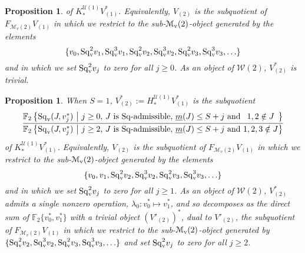 \documentclass[11pt]{amsart}
\theoremstyle{plain}
\newtheorem{prop}[thm]{Proposition}
\theoremstyle{definition}
\newcommand{\calW}{\mathcal{W}}
\newcommand{\calU}{\mathcal{U}}
\newcommand{\calM}{\mathcal{M}}
\theoremstyle{plain}
\newcommand{\minDimSq}{\underline{m}}
\newcommand{\Sq}{\mathrm{Sq}}
\newcommand{\Sqv}{\mathrm{Sq}_\textup{v}}
\newcommand{\F}{\mathbb{F}}
\begin{document}
\begin{Calculations of HWn for n nonzero}
\begin{prop}
 of $K_*^{\calU(1)}V_{(1)}^*$. Equivalently, $V_{(2)}$ is the subquotient of $F_{\calM_v(2)}V_{(1)}$ in which we restrict to the sub-$\calM_\textup{v}(2)$-object generated by the elements%
\[\{v_0,\Sqv^2v_{1},\Sqv^3v_{1},\Sqv^2v_{2},\Sqv^3v_{2},\Sqv^2v_{3},\Sqv^3v_{3},\ldots\}\]
and in which we set $\Sqv^2 v_{j}$ to zero for all $j\geq0$.   As an object of $\calW(2)$, $V_{(2)}^{*}$ is trivial.
\end{prop}
\begin{prop}\label{Se1 calc of V2}
When $S=1$, $V^*_{(2)}:=H_*^{\calU(1)}V_{(1)}^{*}$ is the subquotient
\[\frac{{\F_{2}\left\{\Sq_{\textup{v}}(J,v_j^*)\ \middle|\ \makebox[\widthof{$\textup{$j\geq2$}$}][c]{$\textup{$j\geq0$}$}\textup{, $J$ is $\Sq$-admissible, $\minDimSq(J)\leq S+j$ and}\makebox[\widthof{$\textup{ $1,2,3\notin J$}$}][c]{$\textup{ $1,2\notin J$}$}\right\}}}{{\F_{2}\left\{\Sq_{\textup{v}}(J,v_j^*)\ \middle|\ \makebox[\widthof{$\textup{$j\geq2$}$}][c]{$\textup{$j\geq2$}$}\textup{, $J$ is $\Sq$-admissible, $\minDimSq(J)\leq S+j$ and}\makebox[\widthof{$\textup{ $1,2,3\notin J$}$}][c]{$\textup{ $1,2,3\notin J$}$}\right\}}}\]
 of $K_*^{\calU(1)}V_{(1)}^*$. Equivalently, $V_{(2)}$ is the subquotient of $F_{\calM_v(2)}V_{(1)}$ in which we restrict to the sub-$\calM_\textup{v}(2)$-object generated by the elements%
\[\{v_0,v_1,\Sqv^2v_{2},\Sqv^3v_{2},\Sqv^2v_{3},\Sqv^3v_{3},\ldots\}\]
and in which we set $\Sqv^2 v_{j}$ to zero for all $j\geq1$.  As an object of $\calW(2)$, $V_{(2)}^{*}$ admits a single nonzero operation, $\lambda_0:v_0^*\longmapsto v_1^*$, and so decomposes as the direct sum of
$\F_2\{v_0^*,v_1^*\}$ with a trivial object $(V'_{(2)})^*$, dual to $V'_{(2)}$, the subquotient of $F_{\calM_v(2)}V_{(1)}$ in which we restrict to the sub-$\calM_\textup{v}(2)$-object generated by
$\{\Sqv^2v_{2},\Sqv^3v_{2},\Sqv^2v_{3},\Sqv^3v_{3},\ldots\}$ and set $\Sqv^2 v_{j}$ to zero for all $j\geq2$.
\end{prop}
%

\end{Calculations of HWn for n nonzero}
\end{document}
